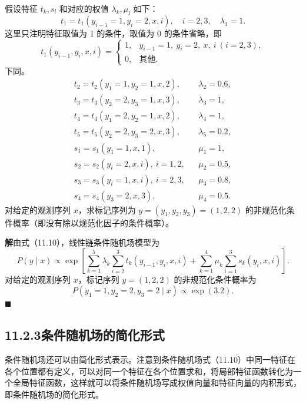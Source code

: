 \documentclass[UTF8,12pt,a4paper,fontset=fandol]{ctexart}
\begin{document}
假设特征 $t_k,s_l$ 和对应的权值 $\lambda_k,\mu_l$ 如下：
\[
t_1=t_1(y_{i-1}=1,y_i=2,x,i),\quad i=2,3,\quad \lambda_1=1.
\]
这里只注明特征取值为 1 的条件，取值为 0 的条件省略，即
\[
t_1(y_{i-1},y_i,x,i)=
\begin{cases}
1, & y_{i-1}=1,\ y_i=2,\ x,\ i\ (i=2,3),\\
0, & \text{其他}.
\end{cases}
\]
下同。
\[
\begin{array}{lll}
t_2=t_2(y_1=1,y_2=1,x,2), & & \lambda_2=0.6,\\
t_3=t_3(y_2=2,y_3=1,x,3), & & \lambda_3=1,\\
t_4=t_4(y_1=2,y_2=1,x,2), & & \lambda_4=1,\\
t_5=t_5(y_2=2,y_3=2,x,3), & & \lambda_5=0.2,\\
s_1=s_1(y_1=1,x,1), & & \mu_1=1,\\
s_2=s_2(y_i=2,x,i),\ i=1,2, & & \mu_2=0.5,\\
s_3=s_3(y_i=1,x,i),\ i=2,3, & & \mu_3=0.8,\\
s_4=s_4(y_3=2,x,3), & & \mu_4=0.5.
\end{array}
\]
对给定的观测序列 $x$，求标记序列为 $y=(y_1,y_2,y_3)=(1,2,2)$ 的非规范化条件概率（即没有除以规范化因子的条件概率）。

\noindent\textbf{解}\quad 由式（11.10），线性链条件随机场模型为
\[
P(y\mid x)\propto
\exp\left[
\sum_{k=1}^{5}\lambda_k\sum_{i=2}^{3}t_k(y_{i-1},y_i,x,i)
+\sum_{k=1}^{4}\mu_k\sum_{i=1}^{3}s_k(y_i,x,i)
\right].
\]
对给定的观测序列 $x$，标记序列 $y=(1,2,2)$ 的非规范化条件概率为
\[
P(y_1=1,y_2=2,y_3=2\mid x)\propto \exp(3.2).
\]
\hfill$\blacksquare$

\subsection*{11.2.3\quad 条件随机场的简化形式}

条件随机场还可以由简化形式表示。注意到条件随机场式（11.10）中同一特征在各个位置都有定义，可以对同一个特征在各个位置求和，将局部特征函数转化为一个全局特征函数，这样就可以将条件随机场写成权值向量和特征向量的内积形式，即条件随机场的简化形式。
\end{document}
